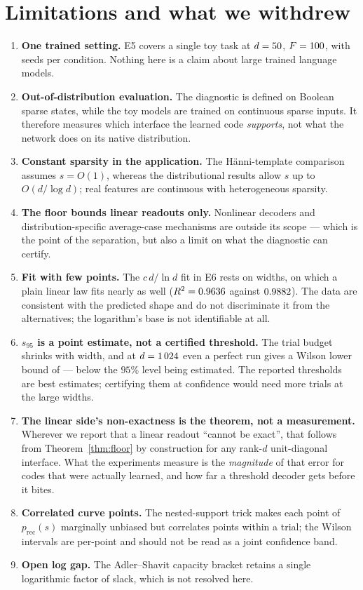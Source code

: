 \section{Limitations and what we withdrew}
\label{sec:limitations}

\begin{enumerate}[leftmargin=*,itemsep=1pt]
\item \textbf{One trained setting.} E5 covers a single toy task at $d=50$, $F=100$,
with \EfiveSeeds{} seeds per condition. Nothing here is a claim about large trained language
models.
\item \textbf{Out-of-distribution evaluation.} The diagnostic is defined on Boolean sparse
states, while the toy models are trained on continuous sparse inputs. It therefore measures
which interface the learned code \emph{supports}, not what the network does on its native
distribution.
\item \textbf{Constant sparsity in the application.} The H\"{a}nni-template comparison assumes
$s=O(1)$, whereas the distributional results allow $s$ up to $O(d/\log d)$; real features are
continuous with heterogeneous sparsity.
\item \textbf{The floor bounds linear readouts only.} Nonlinear decoders and
distribution-specific average-case mechanisms are outside its scope --- which is the point of
the separation, but also a limit on what the diagnostic can certify.
\item \textbf{Fit with few points.} The $c\,d/\ln d$ fit in E6 rests on \EsixFitPoints{}
widths, on which a plain linear law fits nearly as well ($R^2=0.9636$ against
$0.9882$). The data are consistent with the predicted shape and do not discriminate
it from the alternatives; the logarithm's base is not identifiable at all.

\item \textbf{$s_{95}$ is a point estimate, not a certified threshold.} The trial budget shrinks
with width, and at $d=1\,024$ even a perfect run gives a Wilson lower bound of
\EsixTopBestWilsonLow --- below the $95\%$ level being estimated. The reported thresholds are
best estimates; certifying them at confidence would need more trials at the large widths.

\item \textbf{The linear side's non-exactness is the theorem, not a measurement.} Wherever we
report that a linear readout ``cannot be exact'', that follows from
Theorem~\ref{thm:floor} by construction for any rank-$d$ unit-diagonal interface. What the
experiments measure is the \emph{magnitude} of that error for codes that were actually learned,
and how far a threshold decoder gets before it bites.
\item \textbf{Correlated curve points.} The nested-support trick makes each point of
$p_{\mathrm{rec}}(s)$ marginally unbiased but correlates points within a trial; the Wilson
intervals are per-point and should not be read as a joint confidence band.
\item \textbf{Open log gap.} The Adler--Shavit capacity bracket retains a single logarithmic
factor of slack, which is not resolved here.


\end{enumerate}
